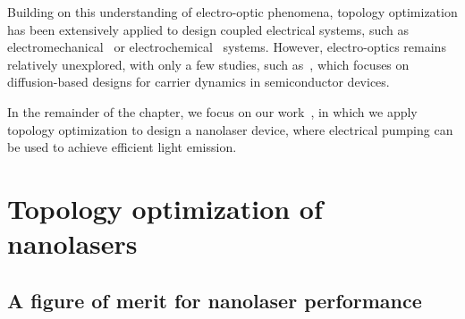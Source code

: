 Building on this understanding of electro-optic phenomena, topology optimization has been extensively applied to design coupled electrical systems, such as electromechanical~\cite{MEMS_multi,electrostatic_act} or electrochemical~\cite{electrode} systems. However, electro-optics remains relatively unexplored, with only a few studies, such as~\cite{g_heat}, which focuses on diffusion-based designs for carrier dynamics in semiconductor devices.

In the remainder of the chapter, we focus on our work~\cite{ownpub4}, in which we apply topology 
optimization to design a nanolaser device, where electrical pumping can be used to achieve efficient light emission.

\section{Topology optimization of nanolasers~\cite{ownpub4}}\label{sec:laser}

\subsection*{A figure of merit for nanolaser performance}

